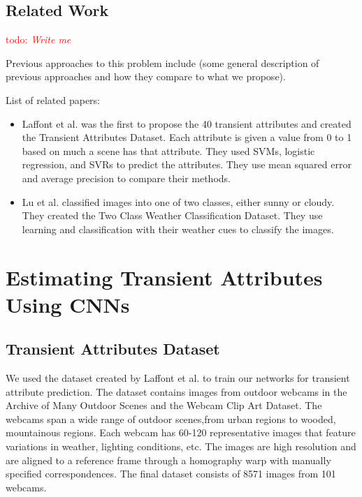 \documentclass{article}
\newcommand{\todo}[1]{\textcolor{red}{todo: {\em #1}}}
\begin{document}
\subsection{Related Work}

\todo{Write me}

Previous approaches to this problem include (some general description
of previous approaches and how they compare to what we propose).

List of related papers:
\begin{itemize}

	\item Laffont\cite{Laffont14} et al. was the first to propose the 40
		transient attributes and created the Transient Attributes Dataset.
		Each attribute is given a value from 0 to 1 based on much a scene
		has that attribute. 	They used SVMs, logistic regression, and SVRs 
		to predict the attributes.  They use mean squared error and average 
		precision to compare their methods.

	\item Lu\cite{lutwoclass} et al. classified images into one of two 
		classes, either sunny or cloudy.  They created the Two Class 
		Weather Classification Dataset.  They use learning and classification
		with their weather cues to classify the images. 

\end{itemize}

\section{Estimating Transient Attributes Using CNNs}

\subsection{Transient Attributes Dataset}
\indent

We used the dataset created by Laffont\cite{Laffont14} et al. to train our 
networks for transient attribute prediction. The dataset contains images from 
outdoor webcams in the Archive of Many Outdoor Scenes\cite{jacobs07amos} and 
the Webcam Clip Art Dataset\cite{lalondesig09}.  The webcams span a wide range 
of outdoor scenes,from urban regions to wooded, mountainous regions. Each webcam 
has 60-120 representative images that feature variations in weather, lighting 
conditions, etc.  The images are high resolution and are aligned to a reference 
frame through a homography warp with manually specified correspondences.  The 
final dataset consists of 8571 images from 101 webcams.
\end{document}
